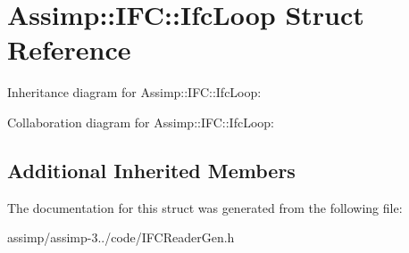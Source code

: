\hypertarget{struct_assimp_1_1_i_f_c_1_1_ifc_loop}{\section{Assimp\+:\+:I\+F\+C\+:\+:Ifc\+Loop Struct Reference}
\label{struct_assimp_1_1_i_f_c_1_1_ifc_loop}
}


Inheritance diagram for Assimp\+:\+:I\+F\+C\+:\+:Ifc\+Loop\+:


Collaboration diagram for Assimp\+:\+:I\+F\+C\+:\+:Ifc\+Loop\+:
\subsection*{Additional Inherited Members}


The documentation for this struct was generated from the following file\+:\begin{DoxyCompactItemize}
\item 
assimp/assimp-\/3../code/I\+F\+C\+Reader\+Gen.\+h\end{DoxyCompactItemize}
